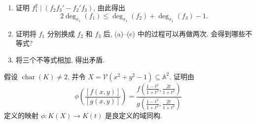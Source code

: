 \begin{BookExercises}
\begin{enumerate}
    \item 证明 $f_{1}^{2}\mid(f_{2}f_{3}'-f_{2}'f_{3})$, 由此得出
    \[
      2\deg_{x_{1}}(f_{1})\leq\deg_{x_{1}}(f_{2})+\deg_{x_{1}}(f_{3})-1.
    \]
    \item 证明将 $f_{1}$ 分别换成 $f_{2}$ 和 $f_{3}$ 后, (a)--(c) 中的过程可以再做两次. 会得到哪些不等式?
    \item 将三个不等式相加, 得出矛盾.
  \end{enumerate}
  \item\label{ex:circle-function-field-isomorphism} 假设 $\operatorname{char}(K)\neq2$, 并令 $X=\mathcal{V}(x^{2}+y^{2}-1)\subseteq\mathbb{A}^{2}$. 证明由
  \[
    \phi\left(\frac{[f(x,y)]}{[g(x,y)]}\right)
    =\frac{f\left(\frac{1-t^{2}}{1+t^{2}},\frac{2t}{1+t^{2}}\right)}
           {g\left(\frac{1-t^{2}}{1+t^{2}},\frac{2t}{1+t^{2}}\right)}
  \]
  定义的映射 $\phi:K(X)\to K(t)$ 是良定义的域同构.
\end{BookExercises}

